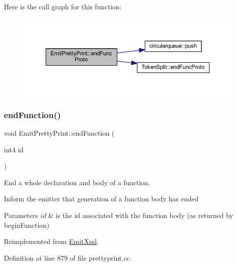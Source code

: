 Here is the call graph for this function\+:
\nopagebreak
\begin{figure}[H]
\begin{center}
\leavevmode
\includegraphics[width=350pt]{class_emit_pretty_print_a4eac637afa829305fb6cda48ed09bcbb_cgraph}
\end{center}
\end{figure}
\mbox{\label{class_emit_pretty_print_a191b3722b5a08d9650dc7dc1216eac9d}} 
\subsubsection{\texorpdfstring{endFunction()}{endFunction()}}
{\footnotesize\ttfamily void Emit\+Pretty\+Print\+::end\+Function (\begin{DoxyParamCaption}\item[{int4}]{id }\end{DoxyParamCaption})\hspace{0.3cm}{\ttfamily [virtual]}}



End a whole declaration and body of a function. 

Inform the emitter that generation of a function body has ended 
\begin{DoxyParams}{Parameters}
{\em id} & is the id associated with the function body (as returned by begin\+Function) \\
\hline
\end{DoxyParams}


Reimplemented from \mbox{\hyperlink{class_emit_xml_ac1cfefc98a7cfbfa0c479cac8a1e2a71}{Emit\+Xml}}.



Definition at line 879 of file prettyprint.\+cc.

